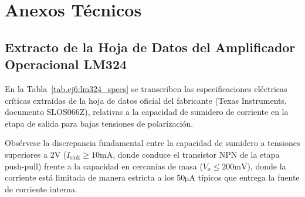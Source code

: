 \chapter{Anexos Técnicos}
\label{sec.ej6:anexos}

\section{Extracto de la Hoja de Datos del Amplificador Operacional LM324}
\label{sec.ej6:datasheet_lm324}

En la Tabla~\ref{tab.ej6:lm324_specs} se transcriben las especificaciones eléctricas críticas extraídas de la hoja
de datos oficial del fabricante (Texas Instruments, documento SLOS066Z), relativas a la capacidad de sumidero de
corriente en la etapa de salida para bajas tensiones de polarización.

\begin{table}[!ht]
\centering
{}
\caption{Parámetros eléctricos destacados del amplificador operacional cuádruple LM324.}
\label{tab.ej6:lm324_specs}
\end{table}

Obsérvese la discrepancia fundamental entre la capacidad de sumidero a tensiones superiores a $2 \unit{\volt}$
($I_{\text{sink}} \ge 10 \unit{\milli\ampere}$, donde conduce el transistor NPN de la etapa push-pull) frente a la
capacidad en cercanías de masa ($V_o \le 200 \unit{\milli\volt}$), donde la corriente está limitada de manera
estricta a los $50 \unit{\micro\ampere}$ típicos que entrega la fuente de corriente interna.

